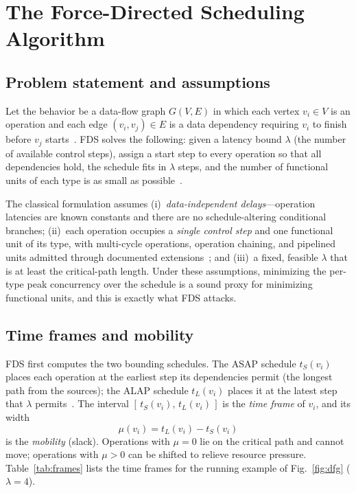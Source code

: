 \documentclass[conference]{IEEEtran}
\begin{document}
\section{The Force-Directed Scheduling Algorithm}\label{sec:fds}

\subsection{Problem statement and assumptions}
Let the behavior be a data-flow graph $G(V,E)$ in which each vertex
$v_i \in V$ is an operation and each edge $(v_i,v_j)\in E$ is a data dependency
requiring $v_i$ to finish before $v_j$ starts~\cite{b5}. FDS solves the following: given
a latency bound $\lambda$ (the number of available control steps), assign a
start step to every operation so that all dependencies hold, the schedule fits
in $\lambda$ steps, and the number of functional units of each type is as small
as possible~\cite{b1}.

The classical formulation assumes (i)~\emph{data-independent delays}---operation
latencies are known constants and there are no schedule-altering conditional
branches; (ii)~each operation occupies a \emph{single control step} and one
functional unit of its type, with multi-cycle operations, operation chaining,
and pipelined units admitted through documented extensions~\cite{b1}; and
(iii)~a fixed, feasible $\lambda$ that is at least the critical-path length.
Under these assumptions, minimizing the per-type peak concurrency over the
schedule is a sound proxy for minimizing functional units, and this is exactly
what FDS attacks.

\subsection{Time frames and mobility}
FDS first computes the two bounding schedules. The ASAP schedule $t_S(v_i)$
places each operation at the earliest step its dependencies permit (the longest
path from the sources); the ALAP schedule $t_L(v_i)$ places it at the latest
step that $\lambda$ permits~\cite{b2}. The interval
$[\,t_S(v_i),\,t_L(v_i)\,]$ is the \emph{time frame} of $v_i$, and its width
\begin{equation}
\mu(v_i) = t_L(v_i) - t_S(v_i)
\label{eq:mobility}
\end{equation}
is the \emph{mobility} (slack). Operations with $\mu = 0$ lie on the critical
path and cannot move; operations with $\mu > 0$ can be shifted to relieve
resource pressure. Table~\ref{tab:frames} lists the time frames for the running
example of Fig.~\ref{fig:dfg} ($\lambda = 4$).
\end{document}

